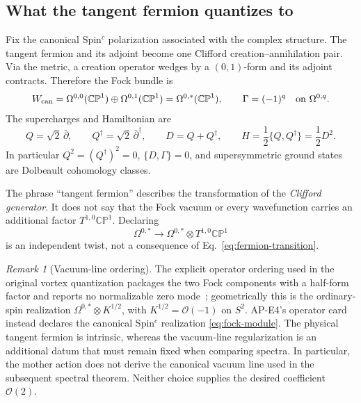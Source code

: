 \documentclass[11pt]{article}
\theoremstyle{definition}
\theoremstyle{remark}
\newtheorem{remark}[theorem]{Remark}
\newcommand{\CP}{\mathbb {CP}}
\newcommand{\cO}{\mathcal O}
\begin{document}
\subsection{What the tangent fermion quantizes to}

Fix the canonical Spin\({}^c\) polarization associated with the complex
structure.  The tangent fermion and its adjoint become one Clifford
creation--annihilation pair.  Via the metric, a creation operator wedges by
a \((0,1)\)-form and its adjoint contracts.  Therefore the Fock bundle is
\begin{equation}
 W_{\rm can}=\Omega^{0,0}(\CP^1)\oplus\Omega^{0,1}(\CP^1)
 =\Omega^{0,*}(\CP^1),
 \qquad \Gamma=(-1)^q\quad\hbox{on }\Omega^{0,q}.
 \label{eq:fock-module}
\end{equation}
The supercharges and Hamiltonian are
\begin{equation}
 Q=\sqrt2\,\bar\partial,\qquad
 Q^\dagger=\sqrt2\,\bar\partial^\dagger,\qquad
 D=Q+Q^\dagger,\qquad
 H=\frac12\{Q,Q^\dagger\}=\frac12D^2.
 \label{eq:untwisted-supercharges}
\end{equation}
In particular \(Q^2=(Q^\dagger)^2=0\),
\(\{D,\Gamma\}=0\), and supersymmetric ground states are Dolbeault
cohomology classes.

The phrase ``tangent fermion'' describes the transformation of the
\emph{Clifford generator}.  It does not say that the Fock vacuum or every
wavefunction carries an additional factor \(T^{1,0}\CP^1\).  Declaring
\begin{equation}
 \Omega^{0,*}\longrightarrow
 \Omega^{0,*}\otimes T^{1,0}\CP^1
 \label{eq:forbidden-double-count}
\end{equation}
is an independent twist, not a consequence of
Eq.~\eqref{eq:fermion-transition}.

\begin{remark}[Vacuum-line ordering]
The explicit operator ordering used in the original vortex quantization
packages the two Fock components with a half-form factor and reports no
normalizable zero mode~\cite{AldrovandiSchaposnik2007APE4SQM}; geometrically
this is the ordinary-spin realization
\(\Omega^{0,*}\otimes K^{1/2}\), with
\(K^{1/2}=\cO(-1)\) on \(S^2\).  AP-E4's operator card instead declares the
canonical Spin\({}^c\) realization \eqref{eq:fock-module}.  The physical
tangent fermion is intrinsic, whereas the vacuum-line regularization is an
additional datum that must remain fixed when comparing spectra.  In
particular, the mother action does not derive the canonical vacuum line used
in the subsequent spectral theorem.  Neither choice supplies the desired
coefficient \(\cO(2)\).
\end{remark}
\end{document}
